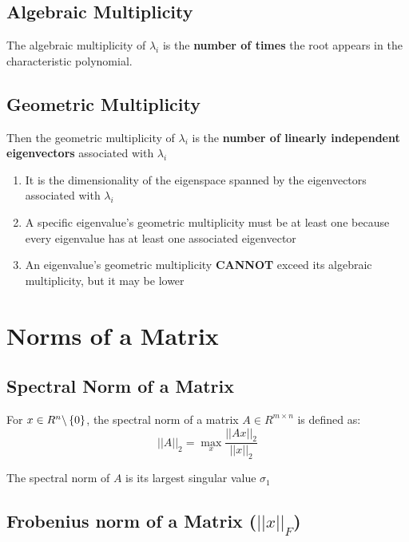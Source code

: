 \subsection{Algebraic Multiplicity}\label{Algebraic Multiplicity}
The algebraic multiplicity of $\lambda_i$ is the \textbf{number of times} the root appears in the characteristic polynomial.


\subsection{Geometric Multiplicity}\label{Geometric Multiplicity}

Then the geometric multiplicity of $\lambda_i$ is the \textbf{number of linearly independent eigenvectors} associated with $\lambda_i$

\begin{enumerate}
    \item It is the dimensionality of the eigenspace spanned by the eigenvectors associated with $\lambda_i$

    \item A specific eigenvalue’s geometric multiplicity must be at least one because every eigenvalue has at least one associated eigenvector

    \item An eigenvalue’s geometric multiplicity \textbf{CANNOT} exceed its algebraic multiplicity, but it may be lower
\end{enumerate}


\section{Norms of a Matrix}\label{Norms of a Matrix}

\subsection{Spectral Norm of a Matrix}\label{Spectral Norm of a Matrix}
For $x \in  R^n\backslash \left\{0\right\}$, the spectral norm of a matrix $A \in  R^{m\times n}$ is defined as:
\[
    \displaystyle
    ||A||_2 = \max_x \dfrac{||Ax||_2}{||x||_2}
\]


\begin{theorem}
    The spectral norm of $A$ is its largest singular value $\sigma_1$
\end{theorem}


\subsection{Frobenius norm of a Matrix ($||x||_F$) \cite{wiki/Matrix_norm}}\label{Frobenius norm of a Matrix}

